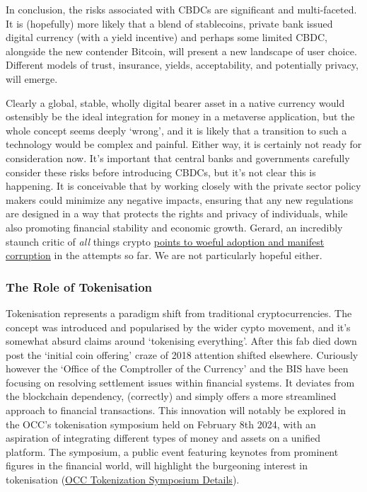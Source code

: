 In conclusion, the risks associated with CBDCs are significant and multi-faceted. It is (hopefully) more likely that a blend of stablecoins, private bank issued digital currency (with a yield incentive) and perhaps some limited CBDC, alongside the new contender Bitcoin, will present a new landscape of user choice. Different models of trust, insurance, yields, acceptability, and potentially privacy, will emerge. \par
Clearly a global, stable, wholly digital bearer asset in a native currency would ostensibly be the ideal integration for money in a metaverse application, but the whole concept seems deeply `wrong', and it is likely that a transition to such a technology would be complex and painful. Either way, it is certainly not ready for consideration now.
It's important that central banks and governments carefully consider these risks before introducing CBDCs, but it's not clear this is happening. It is conceivable that by working closely with the private sector policy makers could minimize any negative impacts, ensuring that any new regulations are designed in a way that protects the rights and privacy of individuals, while also promoting financial stability and economic growth. Gerard, an incredibly staunch critic of \textit{all} things crypto \href{https://davidgerard.co.uk/blockchain/2023/02/28/news-blockchain-mep-eva-kaili-corruption-arrest-nigerian-cbdc-rewrite-bbc-blockchain-misadventures/}{points to woeful adoption and manifest corruption} in the attempts so far. We are not particularly hopeful either.

\subsubsection{The Role of Tokenisation}
Tokenisation represents a paradigm shift from traditional cryptocurrencies. The concept was introduced and popularised by the wider cypto movement, and it's somewhat absurd claims around `tokenising everything'. After this fab died down post the `initial coin offering' craze of 2018 attention shifted elsewhere. Curiously however the `Office of the Comptroller of the Currency' and the BIS have been focusing on resolving settlement issues within financial systems. It deviates from the blockchain dependency, (correctly) and simply offers a more streamlined approach to financial transactions. This innovation will notably be explored in the OCC's tokenisation symposium held on February 8th 2024, with an aspiration of integrating different types of money and assets on a unified platform. The symposium, a public event featuring keynotes from prominent figures in the financial world, will highlight the burgeoning interest in tokenisation (\href{https://www.occ.gov/news-issuances/news-releases/2023/nr-occ-2023-18.html}{OCC Tokenization Symposium Details}).

